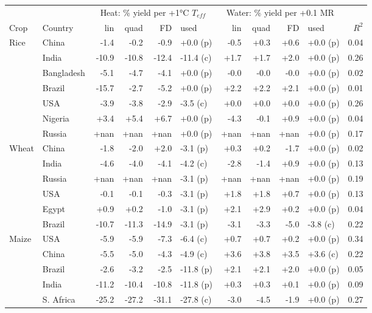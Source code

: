 \begin{tabular}{llrrrlrrrlr}
\toprule
 & & \multicolumn{4}{c}{Heat: \% yield per +1\si{\celsius} $T_{eff}$} & \multicolumn{4}{c}{Water: \% yield per +0.1 MR} & \\
\cmidrule(lr){3-6}\cmidrule(lr){7-10}
Crop & Country & lin & quad & FD & used & lin & quad & FD & used & $R^2$\\
\midrule
Rice & China & -1.4 & -0.2 & -0.9 & +0.0 (p) & -0.5 & +0.3 & +0.6 & +0.0 (p) & 0.04\\
 & India & -10.9 & -10.8 & -12.4 & -11.4 (c) & +1.7 & +1.7 & +2.0 & +0.0 (p) & 0.26\\
 & Bangladesh & -5.1 & -4.7 & -4.1 & +0.0 (p) & -0.0 & -0.0 & -0.0 & +0.0 (p) & 0.02\\
 & Brazil & -15.7 & -2.7 & -5.2 & +0.0 (p) & +2.2 & +2.2 & +2.1 & +0.0 (p) & 0.01\\
 & USA & -3.9 & -3.8 & -2.9 & -3.5 (c) & +0.0 & +0.0 & +0.0 & +0.0 (p) & 0.26\\
 & Nigeria & +3.4 & +5.4 & +6.7 & +0.0 (p) & -4.3 & -0.1 & +0.9 & +0.0 (p) & 0.04\\
 & Russia & +nan & +nan & +nan & +0.0 (p) & +nan & +nan & +nan & +0.0 (p) & 0.17\\
\midrule
Wheat & China & -1.8 & -2.0 & +2.0 & -3.1 (p) & +0.3 & +0.2 & -1.7 & +0.0 (p) & 0.02\\
 & India & -4.6 & -4.0 & -4.1 & -4.2 (c) & -2.8 & -1.4 & +0.9 & +0.0 (p) & 0.13\\
 & Russia & +nan & +nan & +nan & -3.1 (p) & +nan & +nan & +nan & +0.0 (p) & 0.19\\
 & USA & -0.1 & -0.1 & -0.3 & -3.1 (p) & +1.8 & +1.8 & +0.7 & +0.0 (p) & 0.13\\
 & Egypt & +0.9 & +0.2 & -1.0 & -3.1 (p) & +2.1 & +2.9 & +0.2 & +0.0 (p) & 0.04\\
 & Brazil & -10.7 & -11.3 & -14.9 & -3.1 (p) & -3.1 & -3.3 & -5.0 & -3.8 (c) & 0.22\\
\midrule
Maize & USA & -5.9 & -5.9 & -7.3 & -6.4 (c) & +0.7 & +0.7 & +0.2 & +0.0 (p) & 0.34\\
 & China & -5.5 & -5.0 & -4.3 & -4.9 (c) & +3.6 & +3.8 & +3.5 & +3.6 (c) & 0.22\\
 & Brazil & -2.6 & -3.2 & -2.5 & -11.8 (p) & +2.1 & +2.1 & +2.0 & +0.0 (p) & 0.05\\
 & India & -11.2 & -10.4 & -10.8 & -11.8 (p) & +0.3 & +0.3 & +0.1 & +0.0 (p) & 0.09\\
 & S. Africa & -25.2 & -27.2 & -31.1 & -27.8 (c) & -3.0 & -4.5 & -1.9 & +0.0 (p) & 0.27\\

\end{tabular}
